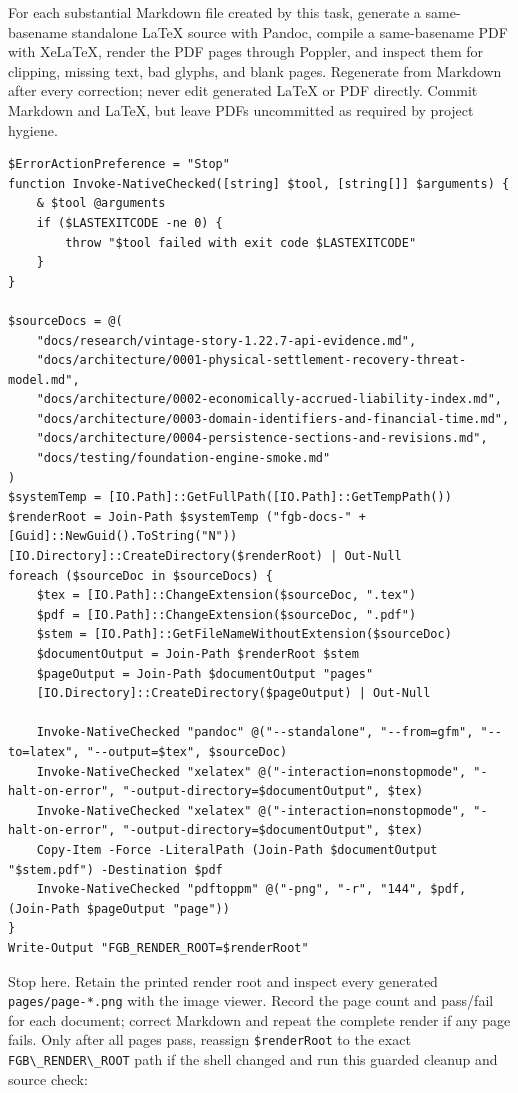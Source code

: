 \documentclass[
  10pt,
  letterpaper,
]{article}
\newcommand{\passthrough}[1]{#1}
\begin{document}
For each substantial Markdown file created by this task, generate a
same-basename standalone LaTeX source with Pandoc, compile a
same-basename PDF with XeLaTeX, render the PDF pages through Poppler,
and inspect them for clipping, missing text, bad glyphs, and blank
pages. Regenerate from Markdown after every correction; never edit
generated LaTeX or PDF directly. Commit Markdown and LaTeX, but leave
PDFs uncommitted as required by project hygiene.

\begin{lstlisting}
$ErrorActionPreference = "Stop"
function Invoke-NativeChecked([string] $tool, [string[]] $arguments) {
    & $tool @arguments
    if ($LASTEXITCODE -ne 0) {
        throw "$tool failed with exit code $LASTEXITCODE"
    }
}

$sourceDocs = @(
    "docs/research/vintage-story-1.22.7-api-evidence.md",
    "docs/architecture/0001-physical-settlement-recovery-threat-model.md",
    "docs/architecture/0002-economically-accrued-liability-index.md",
    "docs/architecture/0003-domain-identifiers-and-financial-time.md",
    "docs/architecture/0004-persistence-sections-and-revisions.md",
    "docs/testing/foundation-engine-smoke.md"
)
$systemTemp = [IO.Path]::GetFullPath([IO.Path]::GetTempPath())
$renderRoot = Join-Path $systemTemp ("fgb-docs-" + [Guid]::NewGuid().ToString("N"))
[IO.Directory]::CreateDirectory($renderRoot) | Out-Null
foreach ($sourceDoc in $sourceDocs) {
    $tex = [IO.Path]::ChangeExtension($sourceDoc, ".tex")
    $pdf = [IO.Path]::ChangeExtension($sourceDoc, ".pdf")
    $stem = [IO.Path]::GetFileNameWithoutExtension($sourceDoc)
    $documentOutput = Join-Path $renderRoot $stem
    $pageOutput = Join-Path $documentOutput "pages"
    [IO.Directory]::CreateDirectory($pageOutput) | Out-Null

    Invoke-NativeChecked "pandoc" @("--standalone", "--from=gfm", "--to=latex", "--output=$tex", $sourceDoc)
    Invoke-NativeChecked "xelatex" @("-interaction=nonstopmode", "-halt-on-error", "-output-directory=$documentOutput", $tex)
    Invoke-NativeChecked "xelatex" @("-interaction=nonstopmode", "-halt-on-error", "-output-directory=$documentOutput", $tex)
    Copy-Item -Force -LiteralPath (Join-Path $documentOutput "$stem.pdf") -Destination $pdf
    Invoke-NativeChecked "pdftoppm" @("-png", "-r", "144", $pdf, (Join-Path $pageOutput "page"))
}
Write-Output "FGB_RENDER_ROOT=$renderRoot"
\end{lstlisting}

Stop here. Retain the printed render root and inspect every generated
\texttt{pages/}\allowbreak{}\texttt{page-}\allowbreak{}\texttt{*.}\allowbreak{}\texttt{png}
with the image viewer. Record the page count and pass/fail for each
document; correct Markdown and repeat the complete render if any page
fails. Only after all pages pass, reassign
\passthrough{\lstinline!$renderRoot!} to the exact
\passthrough{\lstinline!FGB\_RENDER\_ROOT!} path if the shell changed
and run this guarded cleanup and source check:
\end{document}
